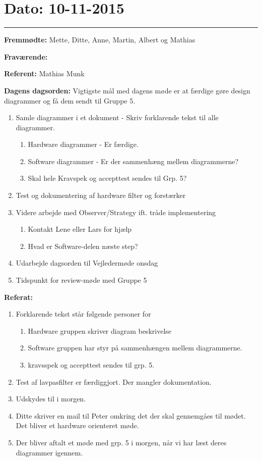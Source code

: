 \section{Dato: 10-11-2015}
\hrule

\textbf{Fremmødte:} Mette, Ditte, Anne, Martin, Albert og Mathias 

\textbf{Fraværende:}

\textbf{Referent:} Mathias Munk

\textbf{Dagens dagsorden:}
Vigtigste mål med dagens møde er at færdige gøre design diagrammer og få dem sendt til Gruppe 5.
\begin{enumerate}
\item Samle diagrammer i et dokument - Skriv forklarende tekst til alle diagrammer.
\begin{enumerate}
\item Hardware diagrammer - Er færdige.
\item Software diagrammer - Er der sammenhæng mellem diagrammerne?
\item Skal hele Kravspek og accepttest sendes til Grp. 5?
\end{enumerate}
\item Test og dokumentering af hardware filter og forstærker
\item Videre arbejde med Observer/Strategy ift. tråde implementering
\begin{enumerate}
\item Kontakt Lene eller Lars for hjælp
\item Hvad er Software-delen næste step?
\end{enumerate}
\item Udarbejde dagsorden til Vejledermøde onsdag
\item Tidspunkt for review-møde med Gruppe 5
\end{enumerate}

\textbf{Referat:}
\begin{enumerate}
\item Forklarende tekst står følgende personer for
\begin{enumerate}
\item Hardware gruppen skriver diagram beskrivelse
\item Software gruppen har styr på sammenhængen mellem diagrammerne.
\item kravsspek og accepttest sendes til grp. 5. 
\end{enumerate}
\item Test af lavpasfilter er færdiggjort. Der mangler dokumentation. 
\item Udskydes til i morgen.
\item Ditte skriver en mail til Peter omkring det der skal gennemgåes til mødet. Det bliver et hardware orienteret møde.
\item Der bliver aftalt et møde med grp. 5 i morgen, når vi har læst deres diagrammer igennem.
\end{enumerate}

